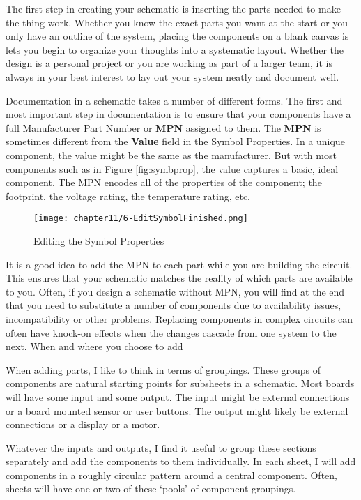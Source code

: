 The first step in creating your schematic is inserting the parts needed to make the thing work.
Whether you know the exact parts you want at the start or you only have an outline of the system, placing the components on a blank canvas is lets you begin to organize your thoughts into a systematic layout.
Whether the design is a personal project or you are working as part of a larger team, it is always in your best interest to lay out your system neatly and document well.

Documentation in a schematic takes a number of different forms.
The first and most important step in documentation is to ensure that your components have a full Manufacturer Part Number or \textbf{MPN} assigned to them.
The \textbf{MPN} is sometimes different from the \textbf{Value} field in the Symbol Properties.
In a unique component, the value might be the same as the manufacturer.
But with most components such as in Figure \ref{fig:symbprop}, the value captures a basic, ideal component.
The MPN encodes all of the properties of the component; the footprint, the voltage rating, the temperature rating, etc.
\begin{figure}
	\texttt{[image: chapter11/6-EditSymbolFinished.png]}
	\caption[fig:symbprop]{Editing the Symbol Properties}
\end{figure}

It is a good idea to add the MPN to each part while you are building the circuit.
This ensures that your schematic matches the reality of which parts are available to you.
Often, if you design a schematic without MPN, you will find at the end that you need to substitute a number of components due to availability issues, incompatibility or other problems.
Replacing components in complex circuits can often have knock-on effects when the changes cascade from one system to the next.
When and where you choose to add 

When adding parts, I like to think in terms of groupings.
These groups of components are natural starting points for subsheets in a schematic.
Most boards will have some input and some output.
The input might be external connections or a board mounted sensor or user buttons.
The output might likely be external connections or a display or a motor.

Whatever the inputs and outputs, I find it useful to group these sections separately and add the components to them individually.
In each sheet, I will add components in a roughly circular pattern around a central component.
Often, sheets will have one or two of these `pools' of component groupings.

